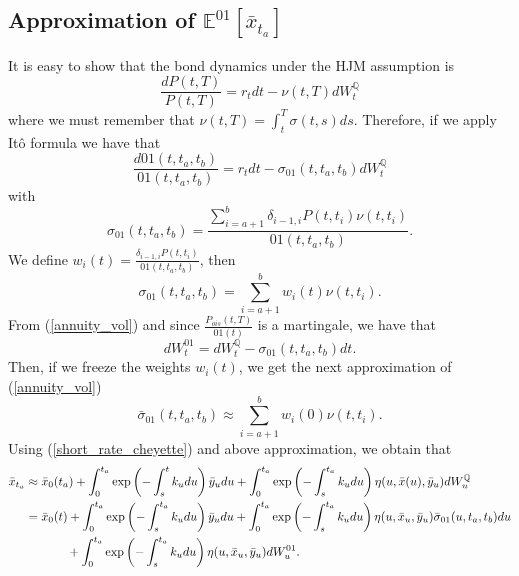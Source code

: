 \documentclass[a4paper,10pt]{article}
\newcommand{\1}{\mathbf{1}}
\begin{document}
\subsection{Approximation of $\mathbb{E}^{01}\left[\bar{x}_{t_a}\right]$}
It is easy to show that the bond dynamics under the HJM assumption is
\begin{equation}
\frac{dP(t,T)}{P(t,T)} = r_t dt - \nu(t,T)dW^{\mathbb{Q}}_t  
\end{equation}
where we must remember that  $\nu(t,T)=\int_{t}^{T}\sigma(t,s) ds$. Therefore, if we apply Itô formula we have that 
\begin{equation}\label{annuity_spot_dynamic}
\frac{d01(t,t_a,t_b)}{01(t,t_a,t_b)} = r_t dt - \sigma_{01}(t,t_a,t_b)dW^{\mathbb{Q}}_t
\end{equation}
with 
\begin{equation} \label{annuity_vol}
\sigma_{01}(t,t_a,t_b) = \frac{\sum_{i=a+1}^{b} \delta_{i-1,i} P(t,t_i) \nu(t,t_i)}{01(t,t_a,t_b)}.
\end{equation}
We define $w_i(t)=\frac{\delta_{i-1,i} P(t,t_i)}{01(t,t_a,t_b)}$, then
\begin{equation*}
\sigma_{01}(t,t_a,t_b) = \sum_{i=a+1}^{b}  w_i(t) \nu(t,t_i).
\end{equation*}
From (\ref{annuity_vol}) and since $\frac{P_{ois}(t,T)}{01(t)}$ is a martingale, we have that
\begin{equation*}
dW^{01}_t = dW^{\mathbb{Q}}_t - \sigma_{01}(t,t_a,t_b)dt. 
\end{equation*}
Then, if we freeze the weights $w_i(t)$, we get the next approximation of (\ref{annuity_vol})
\begin{equation*} \label{approximation_o1_vol}
\bar{\sigma}_{01}(t,t_a,t_b) \approx \sum_{i=a+1}^{b} w_i(0) \nu(t,t_i).
\end{equation*}
Using (\ref{short_rate_cheyette}) and above approximation, we obtain that
\begin{align}
\bar{x}_{t_a} &\approx \bar{x}_0(t_a)  + \int_{0}^{t_a} \exp\left(-\int_{s}^{t}k_u du\right) \bar{y}_u du + \int_{0}^{t_a}  \exp\left(-\int_{s}^{t_a}k_u du \right) \eta(u,\bar{x}(u),\bar{y}_u) dW_u^{\mathbb{Q}} \nonumber \\
&=  \bar{x}_0(t)  + \int_{0}^{t_a} \exp\left(-\int_{s}^{t_a}k_u du\right) \bar{y}_u du + \int_{0}^{t_a} \exp\left(-\int_{s}^{t_a}k_u du \right) \eta(u,\bar{x}_u,\bar{y}_u) \bar{\sigma}_{01}(u, t_a, t_b) du  \nonumber \\ 
&\hspace{1.2cm} + \int_{0}^{t_a} \exp\left(-\int_{s}^{t_a}k_u du \right) \eta(u,\bar{x}_u,\bar{y}_u) dW_u^{01}.
\end{align}
\end{document}

